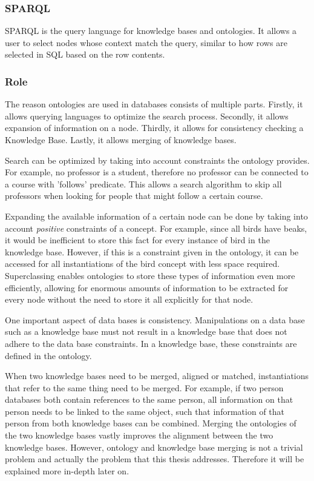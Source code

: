 \documentclass{article}
\begin{document}
 \subsubsection{SPARQL}
 SPARQL is the query language for knowledge bases and ontologies. It allows a user to select nodes whose context match the query, similar to how rows are selected in SQL based on the row contents.
 \subsubsection{Role}
 
 The reason ontologies are used in databases consists of multiple parts. Firstly, it allows querying languages to optimize the search process. Secondly, it allows expansion of information on a node. Thirdly, it allows for consistency checking a Knowledge Base. Lastly, it allows merging of knowledge bases.
 
 Search can be optimized by taking into account constraints the ontology provides. For example, no professor is a student, therefore no professor can be connected to a course with 'follows' predicate. This allows a search algorithm to skip all professors when looking for people that might follow a certain course.
 
 Expanding the available information of a certain node can be done by taking into account \textit{positive} constraints of a concept. For example, since all birds have beaks, it would be inefficient to store this fact for every instance of bird in the knowledge base. However, if this is a constraint given in the ontology, it can be accessed for all instantiations of the bird concept with less space required. Superclassing enables ontologies to store these types of information even more efficiently, allowing for enormous amounts of information to be extracted for every node without the need to store it all explicitly for that node.
 
 One important aspect of data bases is consistency. Manipulations on a data base such as a knowledge base must not result in a knowledge base that does not adhere to the data base constraints. In a knowledge base, these constraints are defined in the ontology.
 
 When two knowledge bases need to be merged, aligned or matched, instantiations that refer to the same thing need to be merged. For example, if two person databases both contain references to the same person, all information on that person needs to be linked to the same object, such that information of that person from both knowledge bases can be combined. Merging the ontologies of the two knowledge bases vastly improves the alignment between the two knowledge bases. However, ontology and knowledge base merging is not a trivial problem and actually the problem that this thesis addresses. Therefore it will be explained more in-depth later on.
\end{document}
